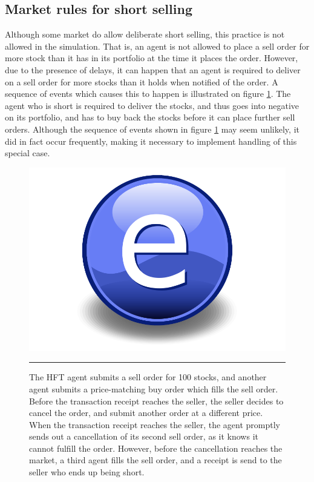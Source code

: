 \subsection{Market rules for short selling}
Although some market do allow deliberate short selling, this practice is not allowed in the simulation. That is, an agent is not allowed to place a sell order for more stock than it has in its portfolio at the time it places the order. However, due to the presence of delays, it can happen that an agent is required to deliver on a sell order for more stocks than it holds when notified of the order. A sequence of events which causes this to happen is  illustrated on figure \ref{fig:short_selling}. The agent who is short is required to deliver the stocks, and thus goes into negative on its portfolio, and has to buy back the stocks before it can place further sell orders. Although the sequence of events shown in figure \ref{fig:short_selling} may seem unlikely, it did in fact occur frequently, making it necessary to implement handling of this special case. 
\begin{figure}[htbp]
	\centering
		\includegraphics{Figures/Electron.pdf}
		\rule{35em}{0.5pt}
	\caption{The HFT agent submits a sell order for 100 stocks, and another agent submits a price-matching buy order which fills the sell order. Before the transaction receipt reaches the seller, the seller decides to cancel the order, and submit another order at a different price. When the transaction receipt reaches the seller, the agent promptly sends out a cancellation of its second sell order, as it knows it cannot fulfill the order. However, before the cancellation reaches the market, a third agent fills the sell order, and a receipt is send to the seller who ends up being short.}
	\label{fig:short_selling}
\end{figure}



